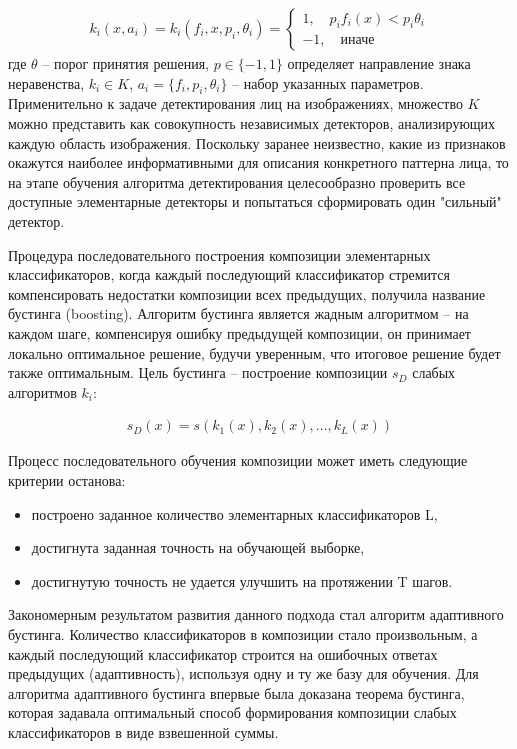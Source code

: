 \begin{gather}
k_i(x, a_i) = k_i(f_i, x, p_i, \theta_i) = 
  \begin{cases}
    1, \quad p_if_i(x) < p_i \theta_i \\
    -1, \quad \text{иначе}
 \end{cases}
\end{gather}
где $\theta$ -- порог принятия решения, $p \in \{−1, 1\}$ определяет направление знака неравенства, $k_i \in K$, $a_i = \{f_i, p_i, \theta_i\}$ -- набор указанных параметров. Применительно к задаче детектирования лиц на изображениях, множество $K$ можно представить как совокупность независимых детекторов, анализирующих каждую область изображения. Поскольку заранее неизвестно, какие из признаков окажутся наиболее информативными для описания конкретного паттерна лица, то на этапе обучения алгоритма детектирования целесообразно проверить все доступные элементарные детекторы и попытаться сформировать один "сильный" детектор.

Процедура последовательного построения композиции элементарных классификаторов, когда каждый последующий классификатор стремится компенсировать недостатки композиции всех предыдущих, получила название бустинга (boosting). Алгоритм бустинга является жадным алгоритмом -- на каждом шаге, компенсируя ошибку предыдущей композиции, он принимает локально оптимальное решение, будучи уверенным, что итоговое решение будет также
оптимальным. Цель бустинга -- построение композиции $s_D$ слабых алгоритмов $k_i$:

\begin{gather}
s_D(x)=s(k_1(x),k_2(x),\dots,k_L(x))
\end{gather}

Процесс последовательного обучения композиции может иметь следующие критерии останова:
\begin{itemize}
\item построено заданное количество элементарных классификаторов L,
\item достигнута заданная точность на обучающей выборке,
\item достигнутую точность не удается улучшить на протяжении T шагов.
\end{itemize}

Закономерным результатом развития данного подхода стал алгоритм адаптивного бустинга. Количество классификаторов в композиции стало произвольным, а каждый последующий классификатор строится на ошибочных ответах предыдущих (адаптивность), используя одну и ту же базу для обучения. Для алгоритма адаптивного бустинга впервые была доказана теорема бустинга, которая задавала оптимальный способ формирования композиции слабых классификаторов в виде взвешенной суммы.


